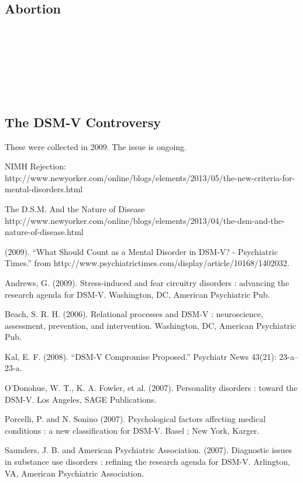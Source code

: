 \begin{refsection}
~\citep{Murre:2015ix}

\subsection{Abortion}
\label{abortion}

~\citep{Anonymous:1993fb}\\
~\citep{Anonymous:1993bn}\\
~\citep{Anonymous:1993jx}\\
~\citep{Anonymous:1979kt}\\
~\citep{Anonymous:1970bi}\\
~\citep{Anonymous:1967hr} 

\subsection{The DSM-V Controversy}
\label{thedsm-vcontroversy}

These were collected in 2009. The issue is ongoing.

NIMH Rejection: http:\slash \slash www.newyorker.com\slash online\slash blogs\slash elements\slash 2013\slash 05\slash the-new-criteria-for-mental-disorders.html 

The D.S.M. And the Nature of Disease
http:\slash \slash www.newyorker.com\slash online\slash blogs\slash elements\slash 2013\slash 04\slash the-dsm-and-the-nature-of-disease.html 

(2009). ``What Should Count as a Mental Disorder in DSM-V? - Psychiatric Times.'' from http:\slash \slash www.psychiatrictimes.com\slash display\slash article\slash 10168\slash 1402032.

Andrews, G. (2009). Stress-induced and fear circuitry disorders : advancing the research agenda for DSM-V. Washington, DC, American Psychiatric Pub.

Beach, S. R. H. (2006). Relational processes and DSM-V : neuroscience, assessment, prevention, and intervention. Washington, DC, American Psychiatric Pub.

Kal, E. F. (2008). ``DSM-V Compromise Proposed.'' Psychiatr News 43(21): 23-a--23-a.

O'Donohue, W. T., K. A. Fowler, et al. (2007). Personality disorders : toward the DSM-V. Los Angeles, SAGE Publications.

Porcelli, P. and N. Sonino (2007). Psychological factors affecting medical conditions : a new classification for DSM-V. Basel ; New York, Karger.

Saunders, J. B. and American Psychiatric Association. (2007). Diagnostic issues in substance use disorders : refining the research agenda for DSM-V. Arlington, VA, American Psychiatric Association.


\end{refsection}
